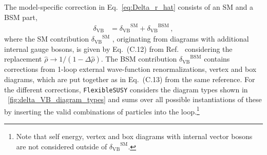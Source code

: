 \documentclass[final,3p,11pt,pdflatex]{elsarticle}
\makeatletter
\newcommand{\fs}{\texttt{FlexibleSUSY}\@\xspace}
\newcommand{\SM}{\ensuremath{\text{SM}}\xspace}
\newcommand{\BSM}{\ensuremath{\text{BSM}}\xspace}
\newcommand{\deltaVB}{\ensuremath{\delta_{\text{VB}}}\xspace}
\newcommand{\figref}[1]{\figurename~\ref{#1}}
\makeatother
\begin{document}
The model-specific correction in Eq.~\eqref{eq:Delta_r_hat}
consists of an SM and a BSM part,
%
\begin{align}
   \deltaVB &= \deltaVB^\SM + \deltaVB^\BSM\,,
\end{align}
%
where the SM contribution $\deltaVB^\SM$
\cite{Degrassi:1990tu}, originating
from diagrams with additional internal gauge bosons, is given by
Eq.~(C.12) from Ref.~\cite{Pierce:1996zz} considering the replacement
$\hat\rho \rightarrow 1/(1-\Delta\hat\rho)$.
The BSM contribution $\deltaVB^\BSM$ contains corrections from
1-loop external wave-function renormalizations, vertex and
box diagrams, which are put together as in Eq.~(C.13) from the
same reference. For the different corrections, \fs considers the
diagram types shown in \figref{fig:delta_VB_diagram_types} and sums
over all possible instantiations of these by inserting the valid
combinations of particles into the loop.\footnote{ Note that
self energy, vertex and box diagrams with internal vector bosons
are not considered outside of $\deltaVB^\SM$.}
%
\end{document}
